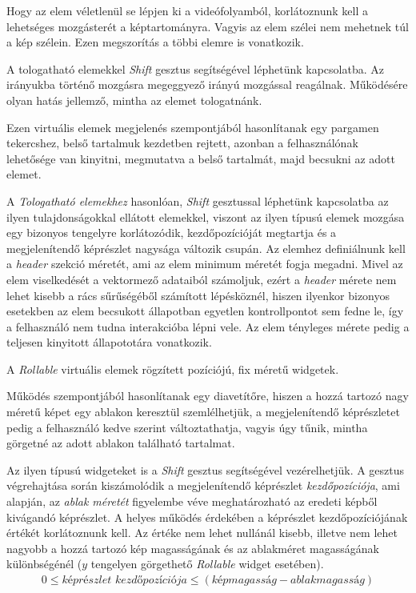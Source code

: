 Hogy az elem véletlenül se lépjen ki a videófolyamból, korlátoznunk kell a lehetséges mozgásterét a képtartományra. Vagyis az elem szélei nem mehetnek túl a kép szélein. Ezen megszorítás a többi elemre is vonatkozik.


A tologatható elemekkel \textit{Shift} gesztus segítségével léphetünk kapcsolatba. Az irányukba történő mozgásra megeggyező irányú mozgással reagálnak. Működésére olyan hatás jellemző, mintha az elemet tologatnánk.


Ezen virtuális elemek megjelenés szempontjából hasonlítanak egy pargamen tekercshez, belső tartalmuk kezdetben rejtett, azonban a felhasználónak lehetősége van kinyitni, megmutatva a belső tartalmát, majd becsukni az adott elemet.

A \textit{Tologatható elemekhez} hasonlóan, \textit{Shift} gesztussal léphetünk kapcsolatba az ilyen tulajdonságokkal ellátott elemekkel, viszont az ilyen típusú elemek mozgása egy bizonyos tengelyre korlátozódik, kezdőpozícióját megtartja és a megjelenítendő képrészlet nagysága változik csupán. Az elemhez definiálnunk kell a \textit{header} szekció méretét, ami az elem minimum méretét fogja megadni. Mivel az elem viselkedését a vektormező adataiból számoljuk, ezért a \textit{header} mérete nem lehet kisebb a rács sűrűségéből számított lépésköznél, hiszen ilyenkor bizonyos esetekben az elem becsukott állapotban egyetlen kontrollpontot sem fedne le, így a felhasználó nem tudna interakcióba lépni vele.
Az elem tényleges mérete pedig a teljesen kinyitott állapototára vonatkozik.


A \textit{Rollable} virtuális elemek rögzített pozíciójú, fix méretű widgetek.

Működés szempontjából hasonlítanak egy diavetítőre, hiszen a hozzá tartozó nagy méretű képet egy ablakon keresztül szemlélhetjük, a megjelenítendő képrészletet pedig a felhasználó kedve szerint változtathatja, vagyis úgy tűnik, mintha görgetné az adott ablakon található tartalmat.

Az ilyen típusú widgeteket is a \textit{Shift} gesztus segítségével vezérelhetjük. A gesztus végrehajtása során kiszámolódik a megjelenítendő képrészlet \textit{kezdőpozíciója}, ami alapján, az \textit{ablak méretét} figyelembe véve meghatározható az eredeti képből kivágandó képrészlet.
A helyes működés érdekében a képrészlet kezdőpozíciójának értékét korlátoznunk kell. Az értéke nem lehet nullánál kisebb, illetve nem lehet nagyobb a hozzá tartozó kép magasságának és az ablakméret magasságának különbségénél ($y$ tengelyen görgethető \textit{Rollable} widget esetében).
\begin{align*}
	0 \leq \textit{képrészlet kezdőpozíciója} \leq (\textit{képmagasság} - \textit{ablakmagasság})
\end{align*}

